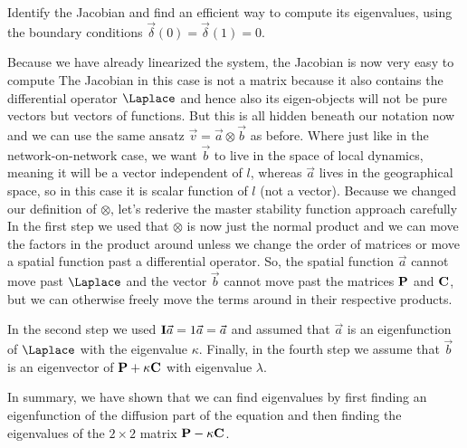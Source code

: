 \subquestion 
Identify the Jacobian and find an efficient way to compute its eigenvalues, using the boundary conditions $\vec{\delta}(0)=\vec{\delta}(1)=0$. 

\solution 
Because we have already linearized the system, the Jacobian is now very easy to compute 
The Jacobian in this case is not a matrix because it also contains the differential operator $\Laplace$ and hence also its eigen-objects will not be pure vectors but vectors of functions. But this is all hidden beneath our notation now and we can use the same ansatz $\vec{v}=\vec{a}\otimes\vec{b}$ as before. Where just like in the network-on-network case, we want $\vec{b}$ to live in the space of local dynamics, meaning it will be a vector independent of $l$, whereas $\vec{a}$ lives in the geographical space, so in this case it is scalar function of $l$ (not a vector). Because we changed our definition of $\otimes$, let's rederive the master stability function approach carefully 
In the first step we used that $\otimes$ is now just the normal product and we can move the factors in the product around unless we change the order of matrices or move a spatial function past a differential operator. So, the spatial function $\vec{a}$ cannot move past $\Laplace$ and the vector $\vec{b}$ cannot move past the matrices $\bf P$ and $\bf C$, but we can otherwise freely move the terms around in their respective products.

In the second step we used ${\bf I}\vec{a}= 1\vec{a} = \vec{a}$ and assumed that $\vec{a}$ is an eigenfunction of $\Laplace$ with the eigenvalue $\kappa$. Finally, in the fourth step we assume that $\vec{b}$ is an eigenvector of ${\bf P}+\kappa {\bf C}$ with eigenvalue $\lambda$. 

In summary, we have shown that we can find eigenvalues by first finding an eigenfunction of the diffusion part of the equation 
and then finding the eigenvalues of the $2\times 2$ matrix ${\bf P}-\kappa{\bf C}$. 

